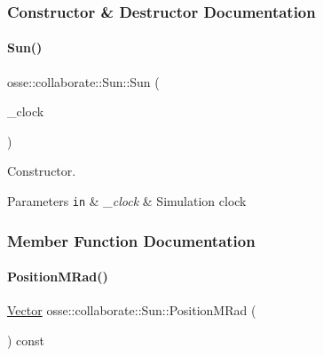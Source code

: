\subsubsection{Constructor \& Destructor Documentation}
\mbox{\label{classosse_1_1collaborate_1_1_sun_a0fee2016c313072585008c22361d5e64}} 
\paragraph{\texorpdfstring{Sun()}{Sun()}}
{\footnotesize\ttfamily osse\+::collaborate\+::\+Sun\+::\+Sun (\begin{DoxyParamCaption}\item[{\hyperlink{classosse_1_1collaborate_1_1_simulation_clock}{Simulation\+Clock} $\ast$}]{\+\_\+clock }\end{DoxyParamCaption})\hspace{0.3cm}{\ttfamily [explicit]}}



Constructor. 


\begin{DoxyParams}[1]{Parameters}
\mbox{\tt in}  & {\em \+\_\+clock} & Simulation clock \\
\hline
\end{DoxyParams}


\subsubsection{Member Function Documentation}
\mbox{\label{classosse_1_1collaborate_1_1_sun_aa1daaa3502398464ce590981c9c9764e}} 
\paragraph{\texorpdfstring{Position\+M\+Rad()}{PositionMRad()}}
{\footnotesize\ttfamily \hyperlink{classosse_1_1collaborate_1_1_vector}{Vector} osse\+::collaborate\+::\+Sun\+::\+Position\+M\+Rad (\begin{DoxyParamCaption}{ }\end{DoxyParamCaption}) const\hspace{0.3cm}{\ttfamily [inline]}}



